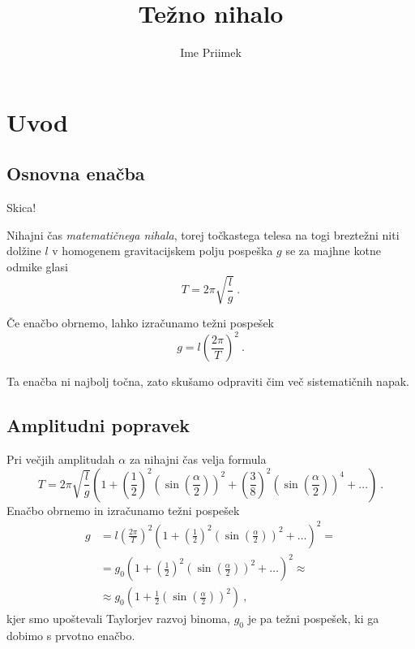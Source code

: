 \documentclass[12pt,a4paper]{article}
\title{Težno nihalo}
\author{Ime Priimek}
\date{}
\begin{document}
\maketitle

\tableofcontents
\pagebreak

\section{Uvod}
\subsection{Osnovna enačba}
Skica!

Nihajni čas \emph{matematičnega nihala}, torej točkastega telesa na togi breztežni niti dolžine $l$ v homogenem gravitacijskem polju pospeška $g$ se za majhne kotne odmike glasi
$$ T = 2\pi \sqrt{\frac{l}{g}} \>. $$

Če enačbo obrnemo, lahko izračunamo težni pospešek
$$ g = l \left( \frac{2\pi}{T} \right)^2 \>. $$

Ta enačba ni najbolj točna, zato skušamo odpraviti čim več sistematičnih napak.

\subsection{Amplitudni popravek}
Pri večjih amplitudah $\alpha$ za nihajni čas velja formula
$$ T = 2\pi \sqrt{\frac{l}{g}} \left( 1 + \left( \frac{1}{2} \right)^2 \left( \sin \left( \frac{\alpha}{2} \right) \right)^{2} + \left( \frac{3}{8} \right)^2 \left( \sin \left( \frac{\alpha}{2} \right) \right)^{4} + \dots \right) \>. $$
Enačbo obrnemo in izračunamo težni pospešek
\begin{eqnarray*}
  g &= l \left( \frac{2\pi}{T} \right)^2 \left( 1 + \left( \frac{1}{2} \right)^2 \left( \sin \left( \frac{\alpha}{2} \right) \right)^{2} + \dots \right)^{2} = \\
  &= g_0 \left( 1 + \left( \frac{1}{2} \right)^2 \left( \sin \left( \frac{\alpha}{2} \right) \right)^{2} + \dots \right)^{2} \approx \\
  &\approx g_0 \left( 1 + \frac{1}{2} \left( \sin \left( \frac{\alpha}{2} \right) \right)^{2} \right) \>,
\end{eqnarray*}
kjer smo upoštevali Taylorjev razvoj binoma, $g_0$ je pa težni pospešek, ki ga dobimo s prvotno enačbo.
\end{document}
